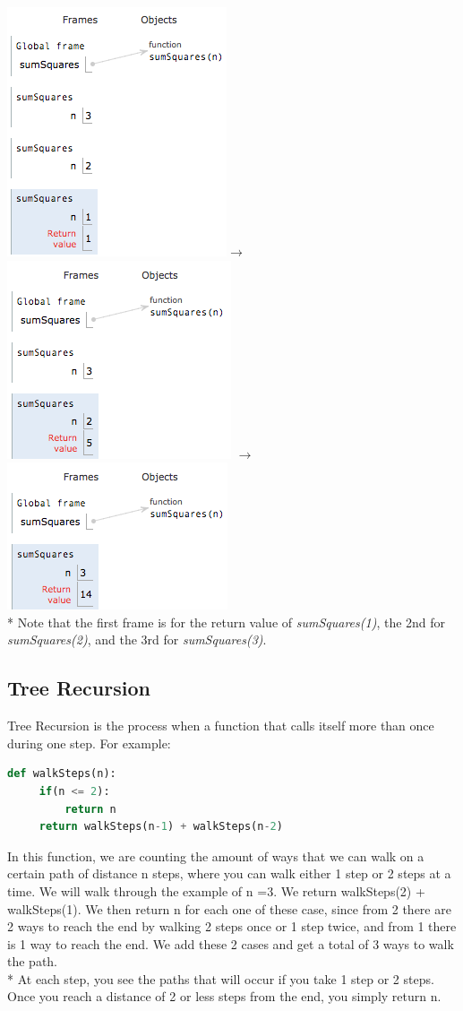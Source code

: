 \documentclass{article}
\begin{document}
\includegraphics[scale=.6]{../images/frame1.png}{\Huge $\rightarrow$}\includegraphics[scale=.6]{../images/frame2.png} {\Huge $\rightarrow$} \includegraphics[scale=.6]{../images/frame3.png} \\*
Note that the first frame is for the return value of \emph{sumSquares(1)}, the 2nd for \emph{sumSquares(2)}, and the 3rd for \emph{sumSquares(3)}.
\subsection{Tree Recursion}
Tree Recursion is the process when a function that calls itself more than once during one step. For example: 
\begin{lstlisting}[language = Python]
def walkSteps(n):
     if(n <= 2):
         return n
     return walkSteps(n-1) + walkSteps(n-2)
\end{lstlisting}
In this function, we are counting the amount of ways that we can walk on a certain path of distance n steps, where you can walk either 1 step or 2 steps at a time. We will walk through the example of n =3. We return walkSteps(2) + walkSteps(1). We then return n for each one of these case, since from 2 there are 2 ways to reach the end by walking 2 steps once or 1 step twice, and from 1 there is 1 way to reach the end. We add these 2 cases and get a total of 3 ways to walk the path. \\*
\bigskip
At each step, you see the paths that will occur if you take 1 step or 2 steps. Once you reach a distance of 2 or less steps from the end, you simply return n. 
\end{document}
